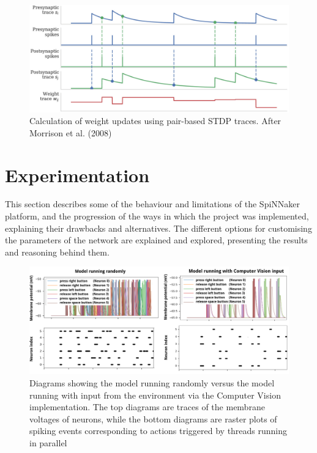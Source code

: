 \documentclass[10pt]{article}
\begin{document}
    \begin{figure}[b]
    \center
    \includegraphics[width=160mm]{./spikeTraces.png}
    \caption{Calculation of weight updates using pair-based STDP traces. After Morrison et al. (2008)}
    \label{fig:spikeTraces}
    \end{figure}

    \section{Experimentation}

    This section describes some of the behaviour and limitations of the SpiNNaker platform, and the progression of the ways in which the project was implemented, explaining their drawbacks and alternatives. The different options for customising the parameters of the network are explained and explored, presenting the results and reasoning behind them.

    \begin{figure}[b]
    \center
    \includegraphics[width=185mm]{./diag12Long.png}
    \caption{Diagrams showing the model running randomly versus the model running with input from the environment via the Computer Vision implementation. The top diagrams are traces of the membrane voltages of neurons, while the bottom diagrams are raster plots of spiking events corresponding to actions triggered by threads running in parallel}
    \label{fig:diag}
    \end{figure}
\end{document}
